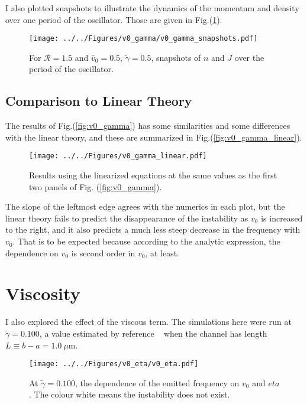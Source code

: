 \documentclass[12pt]{article}
\begin{document}
	I also plotted snapshots to illustrate the dynamics of the momentum and density over one period of the oscillator.  Those are given in Fig.(\ref{fig:v0_gamma_snapshots}).
	\begin{figure}[ht]
		\centering
		\texttt{[image: ../../Figures/v0\_gamma/v0\_gamma\_snapshots.pdf]}
		\caption{For $\mathcal{R} = 1.5$ and $\tilde{v_0} = 0.5$, $\tilde{\gamma} = 0.5$, snapshots of $n$ and $J$ over the period of the oscillator.}\label{fig:v0_gamma_snapshots}
	\end{figure}
	
	\subsection{Comparison to Linear Theory}
	The results of Fig.(\ref{fig:v0_gamma}) has some similarities and some differences with the linear theory, and these are summarized in Fig.(\ref{fig:v0_gamma_linear}).  
	
	\begin{figure}[ht]
		\centering
		\texttt{[image: ../../Figures/v0\_gamma\_linear.pdf]}
		\caption{Results using the linearized equations at the same values as the first two panels of Fig. (\ref{fig:v0_gamma}).}\label{v0_gamma_linear.pdf}
	\end{figure}
	
	The slope of the leftmost edge agrees with the numerics in each plot, but the linear theory fails to predict the disappearance of the instability as $v_0$ is increased to the right, and it also predicts a much less steep decrease in the frequency with $v_0$.  That is to be expected because according to the analytic expression, the dependence on $v_0$ is second order in $v_0$, at least.
	
	\section{Viscosity}
	I also explored the effect of the viscous term.  The simulations here were run at $\tilde{\gamma} = 0.100$, a value estimated by reference ~\cite{Mendl2019} when the channel has length $L \equiv b - a = 1.0\ \mu\text{m}$.
	
	\begin{figure}[H]
		\centering
		\texttt{[image: ../../Figures/v0\_eta/v0\_eta.pdf]}
		\caption{At $\tilde{\gamma} = 0.100$, the dependence of the emitted frequency on $v_0$ and $eta$.  The colour white means the instability does not exist.}\label{fig:v0_eta}
	\end{figure}
	
\end{document}
